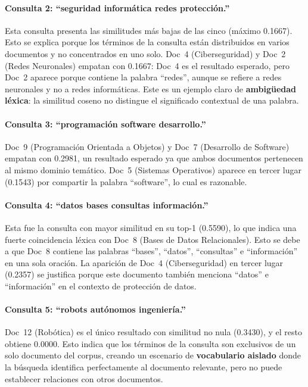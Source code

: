 \paragraph{Consulta 2: ``seguridad informática redes protección.''}
Esta consulta presenta las similitudes más bajas de las cinco (máximo 0.1667). Esto se explica porque los términos de la consulta están distribuidos en varios documentos y no concentrados en uno solo. Doc~4 (Ciberseguridad) y Doc~2 (Redes Neuronales) empatan con 0.1667: Doc~4 es el resultado esperado, pero Doc~2 aparece porque contiene la palabra ``redes'', aunque se refiere a redes neuronales y no a redes informáticas. Este es un ejemplo claro de \textbf{ambigüedad léxica}: la similitud coseno no distingue el significado contextual de una palabra.

\paragraph{Consulta 3: ``programación software desarrollo.''}
Doc~9 (Programación Orientada a Objetos) y Doc~7 (Desarrollo de Software) empatan con 0.2981, un resultado esperado ya que ambos documentos pertenecen al mismo dominio temático. Doc~5 (Sistemas Operativos) aparece en tercer lugar (0.1543) por compartir la palabra ``software'', lo cual es razonable.

\paragraph{Consulta 4: ``datos bases consultas información.''}
Esta fue la consulta con mayor similitud en su top-1 (0.5590), lo que indica una fuerte coincidencia léxica con Doc~8 (Bases de Datos Relacionales). Esto se debe a que Doc~8 contiene las palabras ``bases'', ``datos'', ``consultas'' e ``información'' en una sola oración. La aparición de Doc~4 (Ciberseguridad) en tercer lugar (0.2357) se justifica porque este documento también menciona ``datos'' e ``información'' en el contexto de protección de datos.

\paragraph{Consulta 5: ``robots autónomos ingeniería.''}
Doc~12 (Robótica) es el único resultado con similitud no nula (0.3430), y el resto obtiene 0.0000. Esto indica que los términos de la consulta son exclusivos de un solo documento del corpus, creando un escenario de \textbf{vocabulario aislado} donde la búsqueda identifica perfectamente al documento relevante, pero no puede establecer relaciones con otros documentos.

